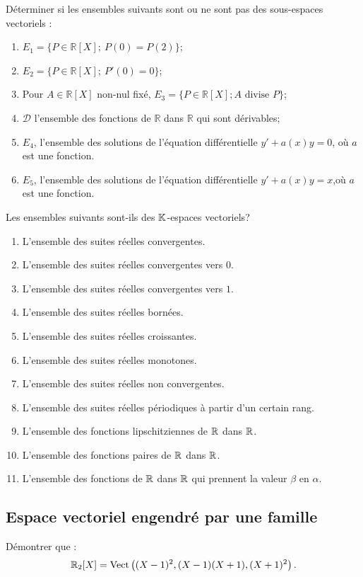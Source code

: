 \documentclass{book}
\begin{document}
\begin{Exercice}
Déterminer si les ensembles suivants sont ou ne sont pas des sous-espaces vectoriels :
\begin{enumerate}
\item $E_1=\{P\in\mathbb R[X];\ P(0)=P(2)\}$;
\item $E_2=\{P\in\mathbb R[X];\ P'(0)=0\}$;
\item Pour $A\in\mathbb R[X]$ non-nul fixé, $E_3=\{P\in\mathbb R[X]; A\text{ divise }P\}$;
\item $\mathcal D$ l'ensemble des fonctions de $\mathbb R$ dans $\mathbb R$ qui sont dérivables;
\item $E_4$, l'ensemble des solutions de l'équation différentielle $y'+a(x) y=0$, où $a$ est une fonction.
\item $E_5$, l'ensemble des solutions de l'équation différentielle $y'+a(x) y=x$,où $a$ est une fonction.
\end{enumerate}
\end{Exercice}

 \begin{Exercice}
Les ensembles suivants sont-ils des $\mathbb{K}  $-espaces vectoriels?
\begin{enumerate}
\item L'ensemble des suites réelles convergentes.
\item L'ensemble des suites réelles convergentes vers $0$.
\item L'ensemble des suites réelles convergentes vers $1$.
\item L'ensemble des suites réelles bornées.
\item L'ensemble des suites réelles croissantes.
\item L'ensemble des suites réelles monotones.
\item L'ensemble des suites réelles non convergentes.
\item L'ensemble des suites réelles périodiques à partir d'un certain rang.
\item L'ensemble des fonctions lipschitziennes de $\mathbb{R} $ dans $\mathbb{R} $.
\item L'ensemble des fonctions paires de $\mathbb{R} $ dans $\mathbb{R} $.
\item L'ensemble des fonctions de $\mathbb{R} $ dans $\mathbb{R} $ qui prennent la valeur $\beta$ en $\alpha$.
\end{enumerate}
\end{Exercice}

\subsection{Espace vectoriel engendré par une famille}
 \begin{Exercice}[Polynôme]
Démontrer que :
$$\mathbb{R}_2[X]=\operatorname{Vect} \left( (X-1)^2,(X-1)(X+1),(X+1)^2\right).$$ 
\end{Exercice}
\end{document}
